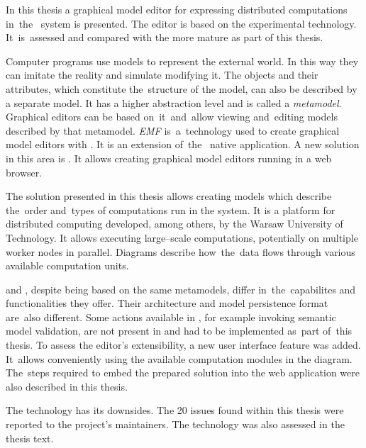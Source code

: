 {
In this thesis a graphical model editor for expressing distributed
computations in~the~\BalticLSC{} system is presented. The editor is based on
the experimental \SiriusWeb{} technology. It~is~assessed and
compared with the more mature \SiriusDesktop{} as part of this thesis.

Computer programs use models to represent the external world. In this way they
can imitate the reality and simulate modifying it. The objects and their
attributes, which constitute the~structure of the model, can also be described
by a separate model. It has a higher abstraction level and is called a
\emph{metamodel}.
Graphical editors can be based on~it~and~allow viewing and~editing models
described by that metamodel. \emph{\acrlong{EMF}} is~a~technology used to
create graphical model editors with \SiriusDesktop{}. It is an extension
of~the~\Eclipse{} native application. A new solution in this area is
\SiriusWeb{}. It
allows creating graphical model editors running in a web browser.

The solution presented in this thesis allows creating models which describe
the~order and~types of computations run in the \BalticLSC{} system. It is a
platform for distributed computing developed, among others, by the Warsaw
University of
Technology. It allows executing large--scale %
computations, potentially on multiple worker nodes in parallel.
Diagrams describe how~the~data flows through various available computation
units.

\SiriusDesktop{} and \SiriusWeb{}, despite being based on the same metamodels,
differ in~the~capabilites and functionalities they offer. Their architecture
and model persistence format are~also different. Some actions available in
\SiriusDesktop{}, for example invoking semantic model validation, are not
present in \SiriusWeb{} and had to be implemented as~part of~this thesis.
To assess the editor's extensibility, a new user interface feature was added.
It~allows conveniently using the available computation modules in the
diagram. The~steps required to embed the prepared solution into the
\BalticLSC{} web application were also described in this thesis.

The \SiriusWeb{} technology has its downsides. The 20 issues found within this
thesis were reported to the project's maintainers. The technology was also
assessed in the thesis text.
}
